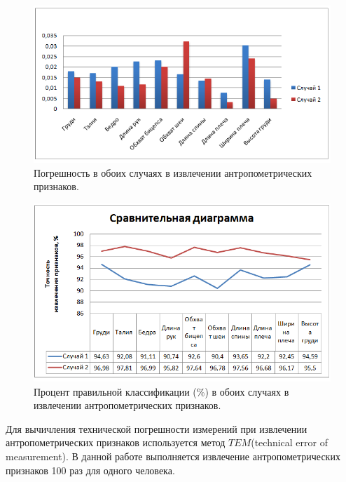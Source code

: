 \begin{figure}[ht!]
\centering
\includegraphics [scale=0.7] {images/h16.png}
\begin{center}
\caption{Погрешность в обоих случаях в извлечении антропометрических признаков.} \label{img16}
\end{center}
\end{figure}

\begin{figure}[ht!]
\centering
\includegraphics [scale=0.7] {images/h18.png}
\begin{center}
\caption{Процент правильной классификации (\%)  в обоих случаях в извлечении антропометрических признаков.} \label{img18}
\end{center}
\end{figure}

Для вычичления технической погрешности измерений при извлечении антропометрических признаков используется метод $TEM$(technical error of measurement)\cite{Stanley1999}. В данной работе выполняется извлечение антропометрических признаков 100 раз для одного человека.

